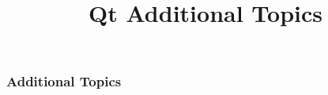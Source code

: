 \documentclass[t]{beamer}
\title{Qt Additional Topics}
\begin{document}


\setcounter{tocdepth}{2} %
\begin{frame}
  \frametitle{Additional Topics}
  \tableofcontents[part=1]
  \vspace{108pt}
\end{frame}

\setcounter{tocdepth}{3} %







\end{document}
